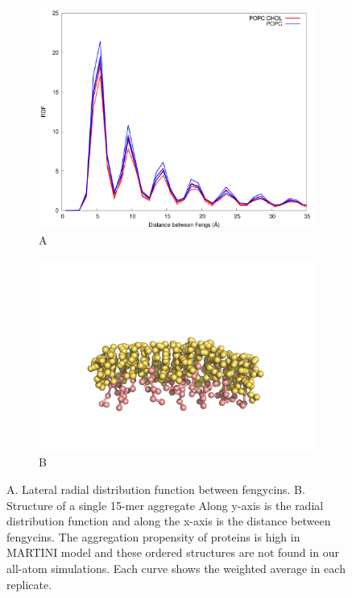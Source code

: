 \begin{figure}[h!]
\centering
\begin{subfigure}{.5\textwidth}
  \centering
  \includegraphics[width=1.0\textwidth]{chapter3_figs/xyrdf_all_ff.pdf}
  \caption{A}
  \label{fig:xyrdf_ff}
\end{subfigure}%
\begin{subfigure}{.5\textwidth}
  \centering
  \includegraphics[width=1.0\textwidth]{chapter3_figs/agg_single.png}
  \caption{B}
  \label{fig:agg}
\end{subfigure}
\caption{A. Lateral radial distribution function between fengycins. B. Structure of a single 15-mer aggregate  Along y-axis is the radial distribution function and along the x-axis is the distance between fengycins.  The aggregation propensity of proteins is high in MARTINI model and these ordered structures are not found in our all-atom simulations\cite{Grossfield2018}. Each curve shows the weighted average in each replicate.}
\label{f:xyrdf_ff}
\end{figure}


